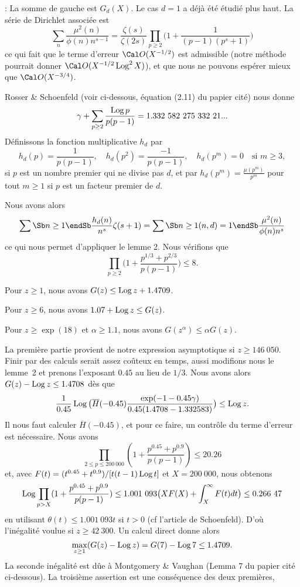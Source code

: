  :
La somme de gauche est $G_d(X)$. Le cas $d=1$ a d\'ej\`a \'et\'e
\'etudi\'e plus haut. La s\'erie de Dirichlet associ\'ee est
$$
\sum_{n}\frac{\mu^2(n)}{\phi(n)n^{s-1}}=
\frac{\zeta(s)}{\zeta(2s)}
\prod_{p\ge2}
\bigg(
1+\frac1{(p-1)(p^s+1)}
\bigg)
$$
ce qui fait que le terme d'erreur $\Cal O(X^{-1/2})$ est admissible
(notre m\'ethode pourrait donner $\Cal O(X^{-1/2}\Log^2X)$), et que
nous ne pouvons esp\'erer mieux que $\Cal O(X^{-3/4})$.
\bigskip

Rosser \& Schoenfeld (voir ci-dessous, \'equation (2.11) du papier
cit\'e) nous donne
$$
\gamma+\sum_{p\ge2}\frac{\operatorname{Log} p}{p(p-1)}=
1.332\ 582\ 275\ 332\ 21...
$$
D\'efinissons la fonction multiplicative $h_d$ par
$$
h_d(p)=\frac1{p(p-1)},
\quad h_d(p^2)=\frac{-1}{p(p-1)},
\quad h_d(p^m)=0
\quad \text{si\ \ }m\ge3,
$$
si $p$ est un nombre premier qui ne divise pas $d$,
et par $h_d(p^m)=\frac{\mu(p^m)}{p^m}$ pour tout
$m\ge1$ si $p$ est un facteur premier de $d$.

Nous avons alors
$$
\sum\Sb n\ge1\endSb\frac{h_d(n)}{n^s}\zeta(s+1)=
\sum\Sb n\ge1\\ (n,d)=1\endSb\frac{\mu^2(n)}{\phi(n)n^s}
$$
ce qui nous permet d'appliquer le lemme 2. Nous v\'erifions que
$$
\prod_{p\ge2}
\bigg(1+\frac{p^{1/3}+p^{2/3}}{p(p-1)}\bigg)
\le8.
$$
\fin

\roster
\item Pour $z\ge1$, nous avons $G(z)\le\operatorname{Log} z+1.4709$.
\item Pour $z\ge6$, nous avons $1.07+\operatorname{Log} z\le G(z)$.
\item Pour $z\ge\exp(18)$ et $\alpha\ge1.1$, nous avons $G(z^\alpha)\le\alpha G(z)$.
\endroster
\endproclaim

La premi\`ere partie provient de notre expression asymptotique si $z\ge146\ 050$.
Finir par des calculs serait assez co\^uteux en temps, aussi modifions
nous le lemme~2 et prenons l'exposant $0.45$ au lieu de $1/3$. Nous
avons alors $G(z)-\operatorname{Log} z\le1.4708$ d\`es que
$$
\frac1{0.45}\operatorname{Log}\big(\overline{H}(-0.45)
\frac{\exp(-1-0.45\gamma)}{0.45(1.4708-1.332583)}\big)\le\operatorname{Log} z.
$$
Il nous faut calculer $\overline{H}(-0.45)$, et pour ce faire, un
contr\^ole du terme d'erreur est n\'ecessaire.
Nous avons
$$
\prod_{2\le p\le200\ 000}(1+\frac{p^{0.45}+p^{0.9}}{p(p-1)})\le20.26
$$
et, avec $F(t)=(t^{0.45}+t^{0.9})/[t(t-1)\operatorname{Log} t]$ et $X=200\ 000$,
nous obtenons
$$
\operatorname{Log}\prod_{p>X}(1+\frac{p^{0.45}+p^{0.9}}{p(p-1)})\le
1.001\ 093\big(XF(X)+\int_X^{\infty}F(t)dt\big)\le0.266\ 47
$$
en utilisant $\theta(t)\le1.001\ 093t$ si $t>0$ (cf l'article de Schoenfeld).
D'o\`u l'in\'egalit\'e voulue si $z\ge42\ 300$.
Un calcul direct donne alors
$$
\max_{z\ge1}(G(z)-\operatorname{Log} z)=G(7)-\operatorname{Log} 7\le1.4709.
$$
La seconde in\'egalit\'e est d\^ue \`a Montgomery \& Vaughan
(Lemma 7 du papier cit\'e ci-dessous). La troisi\`eme assertion est
une cons\'equence des deux premi\`eres,
\fin

